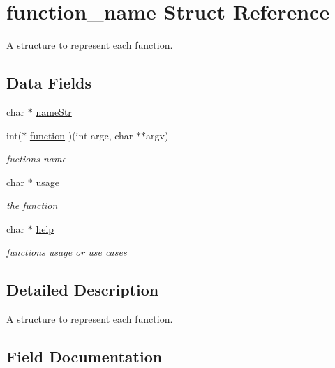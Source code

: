 \hypertarget{structfunction__name}{}\section{function\+\_\+name Struct Reference}
\label{structfunction__name}


A structure to represent each function.  


\subsection*{Data Fields}
\begin{DoxyCompactItemize}
\item 
char $\ast$ \hyperlink{structfunction__name_a7a94f7f31542a15b63160b6b213e0bcb}{name\+Str}
\item 
int($\ast$ \hyperlink{structfunction__name_ad80214b3eea6c438c13ff5461c5350ab}{function} )(int argc, char $\ast$$\ast$argv)
\begin{DoxyCompactList}\small\item\em fuction\textquotesingle{}s name \end{DoxyCompactList}\item 
char $\ast$ \hyperlink{structfunction__name_a30f593e52febda0cc9d9703b9015fb0f}{usage}
\begin{DoxyCompactList}\small\item\em the function \end{DoxyCompactList}\item 
char $\ast$ \hyperlink{structfunction__name_ac0f73e570d7d03a9f378a70e6d4d5632}{help}
\begin{DoxyCompactList}\small\item\em function\textquotesingle{}s usage or use cases \end{DoxyCompactList}\end{DoxyCompactItemize}


\subsection{Detailed Description}
A structure to represent each function. 

\subsection{Field Documentation}
